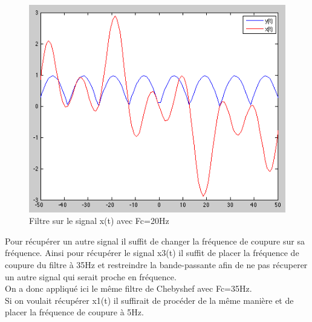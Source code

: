 \documentclass[a4paper, oneside]{report}
\begin{document}
 \begin{figure}[h]
 \centering
 \includegraphics[scale=0.8]{images/fourier_inv.png}
 \caption{Filtre sur le signal x(t) avec Fc=20Hz}
 \end{figure}
 
 Pour r\'ecup\'erer un autre signal il suffit de changer la fr\'equence de coupure sur sa fr\'equence. Ainsi pour r\'ecup\'erer le signal x3(t) il suffit de placer la fr\'equence de coupure du filtre \`a 35Hz et restreindre la bande-passante afin de ne pas r\'ecuperer un autre signal qui serait proche en fr\'equence.\\
 On a donc appliqu\'e ici le m\^eme filtre de Chebyshef avec Fc=35Hz.\\
 Si on voulait r\'ecup\'erer x1(t) il suffirait de proc\'eder de la m\^eme mani\`ere et de placer la fr\'equence de coupure \`a 5Hz.
 
\end{document}
